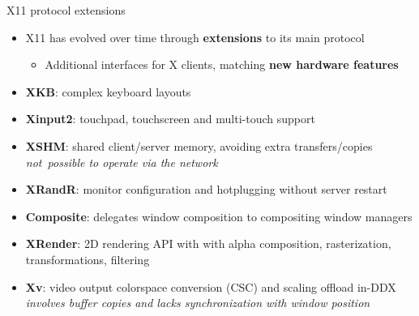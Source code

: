 \begin{frame}{X11 protocol extensions}
  \begin{itemize}
  \item X11 has evolved over time through \textbf{extensions} to its main protocol
    \begin{itemize}
    \item Additional interfaces for X clients, matching \textbf{new hardware features}
    \end{itemize}
  \item \textbf{XKB}: complex keyboard layouts
  \item \textbf{Xinput2}: touchpad, touchscreen and multi-touch support
  \item \textbf{XSHM}: shared client/server memory, avoiding extra transfers/copies\\
    \textit{not\ possible to operate via the network}
  \item \textbf{XRandR}: monitor configuration and hotplugging without server restart
  \item \textbf{Composite}: delegates window composition to compositing window managers
  \item \textbf{XRender}: 2D rendering API with with alpha composition, rasterization, transformations, filtering
  \item \textbf{Xv}: video output colorspace conversion (CSC) and scaling offload in-DDX\\
    \textit{involves buffer copies and lacks synchronization with window position}
  \end{itemize}
\end{frame}

